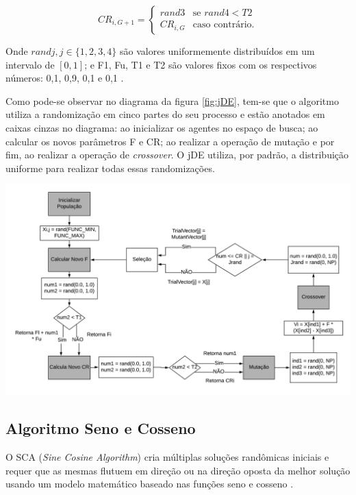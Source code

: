 \begin{equation}
CR_{i,G+1} = 
\begin{cases}
	rand3    & \text{se $rand4 < T2$}\\
    CR_{i,G} & \text{caso contrário.}
\end{cases}
\end{equation}

Onde $randj, j \in \{1, 2, 3, 4\}$ são valores uniformemente distribuídos em um intervalo de $[0, 1]$; e F1, Fu, T1 e T2 são valores fixos com os respectivos números: 0,1, 0,9, 0,1 e 0,1 \cite{brest}.

Como pode-se observar no diagrama da figura \ref{fig:jDE}, tem-se que o algoritmo utiliza a randomização em cinco partes do seu processo e estão anotados em caixas cinzas no diagrama: ao inicializar os agentes no espaço de busca; ao calcular os novos parâmetros F e CR; ao realizar a operação de mutação e por fim, ao realizar a operação de \textit{crossover}. O jDE utiliza, por padrão, a distribuição uniforme para realizar todas essas randomizações.

{
    \centering
    \centerline{\includegraphics[width=1.1\linewidth]{figuras/Diagrama_de_Blocos.png}}
    \label{fig:jDE}
}

\subsection{Algoritmo Seno e Cosseno}
\label{sub:sca}

O SCA (\textit{Sine Cosine Algorithm}) cria múltiplas soluções randômicas iniciais e requer que as mesmas flutuem em direção ou na direção oposta da melhor solução usando um modelo matemático baseado nas funções seno e cosseno \cite{mirjalili}.

